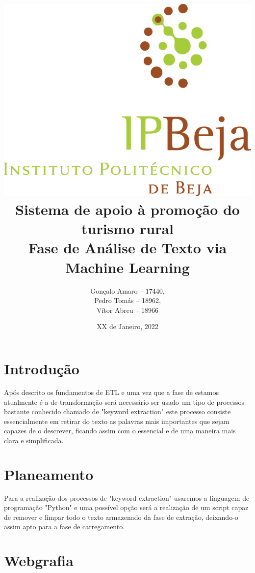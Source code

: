 \documentclass[a4paper,10pt]{article}
\title{\includegraphics[scale=0.5]{ipbeja_logo.png}\\[0.5cm]Sistema de apoio à promoção do turismo rural\\Fase de Análise de Texto via Machine Learning} %
\author{Gonçalo Amaro -- 17440,\\ Pedro Tomás -- 18962,\\ Vítor Abreu -- 18966} %
\date{XX de Janeiro, 2022} %
\def\blankpage{%
      \clearpage%
      \thispagestyle{empty}%
      \addtocounter{page}{-1}%
      \null%
      \clearpage}
\begin{document}


\maketitle

\blankpage{}

{
  \hypersetup{linkcolor=black}
  \tableofcontents
}

\newpage

\section{Introdução}

Após descrito os fundamentos de ETL e uma vez que a fase de estamos atualmente é a de transformação será necessário ser usado um tipo de processos bastante conhecido chamado de "keyword extraction" este processo consiste essencialmente em retirar do texto as palavras mais importantes que sejam capazes de o descrever, ficando assim com o essencial e de uma maneira mais clara e simplificada.

\section{Planeamento}

Para a realização dos processos de "keyword extraction" usaremos a linguagem de programação "Python" e uma possível opção será a realização de um script capaz de remover e limpar todo o texto armazenado da fase de extração, deixando-o assim apto para a fase de carregamento.

\section{Webgrafia}

\renewcommand{\bibsection}{}

\end{document}
